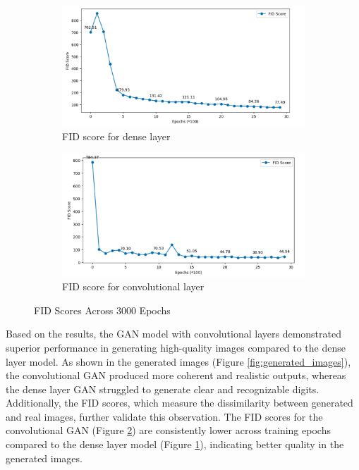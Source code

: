 \begin{figure}[H]
    \centering
    \begin{subfigure}[b]{\linewidth}
        \centering
        \includegraphics[width=0.7\linewidth]{./Images/fid_score_for_dense_layer.jpg}
        \caption{FID score for dense layer}
        \label{fig:fid_dense}
    \end{subfigure}
    \vspace{0.05\linewidth} 
    \begin{subfigure}[b]{\linewidth}
        \centering
        \includegraphics[width=0.7\linewidth]{./Images/fid_score_for_convolution_layer.jpg}
        \caption{FID score for convolutional layer}
        \label{fig:fid_conv}
    \end{subfigure}
    \caption{FID Scores Across 3000 Epochs}
    \label{fig:fid_scores}
\end{figure}

Based on the results, the GAN model with convolutional layers demonstrated superior performance in generating high-quality images compared to the dense layer model. As shown in the generated images (Figure \ref{fig:generated_images}), the convolutional GAN produced more coherent and realistic outputs, whereas the dense layer GAN struggled to generate clear and recognizable digits. Additionally, the FID scores, which measure the dissimilarity between generated and real images, further validate this observation. The FID scores for the convolutional GAN (Figure \ref{fig:fid_conv}) are consistently lower across training epochs compared to the dense layer model (Figure \ref{fig:fid_dense}), indicating better quality in the generated images.

